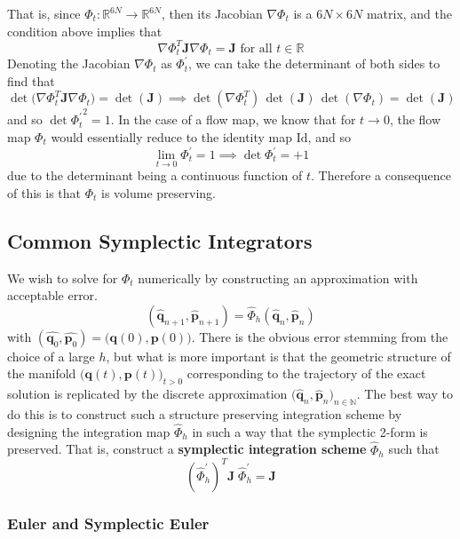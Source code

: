\documentclass{article}
\begin{document}
      That is, since $\Phi_t: \mathbb{R}^{6N} \longrightarrow \mathbb{R}^{6N}$, then its Jacobian $\nabla \Phi_t$ is a $6N \times 6N$ matrix, and the condition above implies that 
      \[\nabla \Phi_t^T \mathbf{J} \nabla \Phi_t = \mathbf{J} \text{ for all } t \in \mathbb{R}\]
      Denoting the Jacobian $\nabla \Phi_t$ as $\Phi_t^\prime$, we can take the determinant of both sides to find that 
      \[\det\big(\nabla \Phi_t^T \mathbf{J} \nabla \Phi_t\big) = \det(\mathbf{J}) \implies \det(\nabla \Phi_t^T) \, \det(\mathbf{J})\, \det(\nabla \Phi_t) = \det(\mathbf{J})\]
      and so $\det{\Phi_t^\prime}^2 = 1$. In the case of a flow map, we know that for $t \rightarrow 0$, the flow map $\Phi_{t}$ would essentially reduce to the identity map $\mathrm{Id}$, and so
      \[\lim_{t \rightarrow 0} \Phi_t^\prime = 1 \implies \det{\Phi_t^\prime} = + 1\]
      due to the determinant being a continuous function of $t$. Therefore a consequence of this is that $\Phi_t$ is volume preserving. 

  \subsection{Common Symplectic Integrators}

    We wish to solve for $\Phi_t$ numerically by constructing an approximation with acceptable error. 
    \[(\hat{\mathbf{q}}_{n+1}, \hat{\mathbf{p}}_{n+1}) = \hat{\Phi}_{h} (\hat{\mathbf{q}}_{n}, \hat{\mathbf{p}}_{n})\]
    with $(\hat{\mathbf{q}_0}, \hat{\mathbf{p}_0}) = \big( \mathbf{q}(0), \mathbf{p}(0)\big)$. There is the obvious error stemming from the choice of a large $h$, but what is more important is that the geometric structure of the manifold $\big( \mathbf{q}(t), \mathbf{p}(t)\big)_{t > 0}$ corresponding to the trajectory of the exact solution is replicated by the discrete approximation $\big(\hat{\mathbf{q}}_n, \hat{\mathbf{p}}_n\big)_{n \in \mathbb{N}}$. The best way to do this is to construct such a structure preserving integration scheme by designing the integration map $\hat{\Phi}_{h}$ in such a way that the symplectic 2-form is preserved. That is, construct a \textbf{symplectic integration scheme} $\hat{\Phi}_{h}$ such that 
    \[(\hat{\Phi}_{h}^\prime)^T \mathbf{J} \; \hat{\Phi}_{h}^\prime = \mathbf{J}\]

    \subsubsection{Euler and Symplectic Euler}
\end{document}
